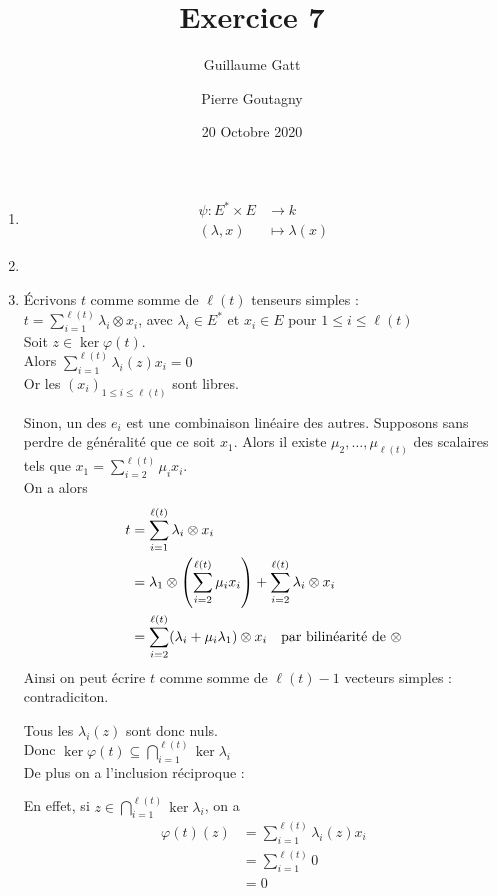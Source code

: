 \documentclass{article}
\title{Exercice 7}
\author{Guillaume Gatt \and Pierre Goutagny}
\date{20 Octobre 2020}
\def \r {{\ell(t)}}
\begin{document}
\thispagestyle{empty}
\begin{enumerate}[1., start=1]
    \item \begin{align*}
            \psi \colon E^{\ast} \times E &\longrightarrow k \\
                   (\lambda, x) &\longmapsto \lambda(x)
          \end{align*}

    \item

    \item \'Ecrivons $t$ comme somme de $\r$ tenseurs simples :\\
        $t = \sum_{i=1}^\r \lambda_i \otimes x_i$, avec $\lambda_i \in E^\ast$ et $x_i \in E$ pour $1 \leq i \leq \r$ \\
        Soit $z\in \ker\varphi(t)$.\\
        Alors $\sum_{i=1}^\r \lambda_i(z)x_i=0$\\
        Or les $(x_i)_{1\leq i \leq \r}$ sont libres.

        \par \setlength{\leftskip}{.2cm}
            Sinon, un des $e_i$ est une combinaison linéaire des autres. Supposons sans perdre de généralité que ce soit $x_1$. Alors il existe $\mu_2, \ldots, \mu_\r$ des scalaires tels que $x_1 = \sum_{i=2}^\r\mu_i x_i$.\\
            On a alors 
            \begin{align*} t &= \sum_{i=1}^\r \lambda_i \otimes x_i \\
                &= \lambda_1\otimes\left(\sum_{i=2}^\r\mu_i x_i \right) + \sum_{i=2}^\r \lambda_i \otimes x_i \\
                &= \sum_{i=2}^\r (\lambda_i + \mu_i \lambda_1) \otimes x_i \text{\quad par bilinéarité de }\otimes
            \end{align*}
            Ainsi on peut écrire $t$ comme somme de $\r - 1$ vecteurs simples : contradiciton.

        \par \setlength{\leftskip}{0cm}
        Tous les $\lambda_i(z)$ sont donc nuls.\\
        Donc $\displaystyle\ker\varphi(t) \subseteq \bigcap_{i=1}^\r\ker\lambda_i$\\
        De plus on a l'inclusion réciproque :

        \par \setlength{\leftskip}{.2cm}
            En effet, si $z\in \bigcap_{i=1}^\r\ker\lambda_i$, on a
            \begin{align*}
                \varphi(t)(z) &= \sum_{i=1}^\r\lambda_i(z)x_i \\
                              &= \sum_{i=1}^\r 0 \\
                              &= 0
            \end{align*}


\end{enumerate}
\end{document}
